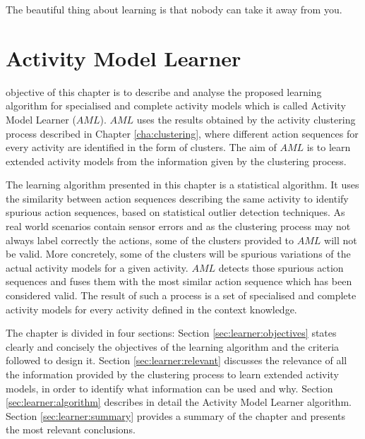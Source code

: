 

\begin{savequote}[50mm]
The beautiful thing about learning is that nobody can take it away from you.
\end{savequote}


\chapter{Activity Model Learner}
\label{cha:learner}

\ifpdf
    \graphicspath{{5_activity_model_learner/figures/PDF/}{5_activity_model_learner/figures/PNG/}{5_activity_model_learner/figures/}}
\else
    \graphicspath{{5_activity_model_learner/figures/EPS/}{5_activity_model_learner/figures/}}
\fi

 objective of this chapter is to describe and analyse the proposed learning algorithm for specialised and complete activity models which is called Activity Model Learner ($AML$). $AML$ uses the results obtained by the activity clustering process described in Chapter \ref{cha:clustering}, where different action sequences for every activity are identified in the form of clusters. The aim of $AML$ is to learn extended activity models from the information given by the clustering process.

The learning algorithm presented in this chapter is a statistical algorithm. It uses the similarity between action sequences describing the same activity to identify spurious action sequences, based on statistical outlier detection techniques. As real world scenarios contain sensor errors and as the clustering process may not always label correctly the actions, some of the clusters provided to $AML$ will not be valid. More concretely, some of the clusters will be spurious variations of the actual activity models for a given activity. $AML$ detects those spurious action sequences and fuses them with the most similar action sequence which has been considered valid. The result of such a process is a set of specialised and complete activity models for every activity defined in the context knowledge. 

The chapter is divided in four sections: Section \ref{sec:learner:objectives} states clearly and concisely the objectives of the learning algorithm and the criteria followed to design it. Section \ref{sec:learner:relevant} discusses the relevance of all the information provided by the clustering process to learn extended activity models, in order to identify what information can be used and why. Section \ref{sec:learner:algorithm} describes in detail the Activity Model Learner algorithm. Section \ref{sec:learner:summary} provides a summary of the chapter and presents the most relevant conclusions.